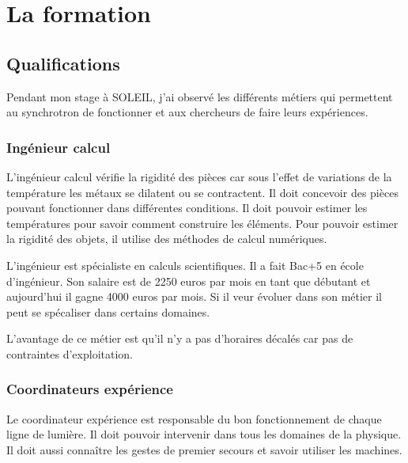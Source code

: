 
\chapter{La formation}
	\minitoc
	




			
	\section{Qualifications}

		Pendant mon stage à SOLEIL, j'ai observé les différents métiers qui permettent au synchrotron de fonctionner et aux chercheurs de faire leurs expériences.			

		\subsection{Ingénieur calcul}
			L'ingénieur calcul vérifie la rigidité des pièces car sous l'effet de variations de la température les métaux se dilatent ou se contractent. Il doit concevoir des pièces pouvant fonctionner dans différentes conditions. Il doit pouvoir estimer les températures pour savoir comment construire les éléments. Pour pouvoir estimer la rigidité des objets, il utilise des méthodes de calcul numériques.
			
			L'ingénieur est spécialiste en calculs scientifiques. Il a fait Bac+5 en école d'ingénieur. Son salaire est de 2250 euros par mois en tant que débutant et aujourd'hui il gagne 4000 euros par mois. Si il veur évoluer dans son métier il peut se spécaliser dans certains domaines.
			
			L'avantage de ce métier est qu'il n'y a pas d'horaires décalés car pas de contraintes d'exploitation.  
		
		\subsection{Coordinateurs expérience}
			Le coordinateur expérience est responsable du bon fonctionnement de chaque ligne de lumière. Il doit pouvoir intervenir dans tous les domaines de la physique. Il doit aussi connaître les gestes de premier secours et savoir utiliser les machines.
			
